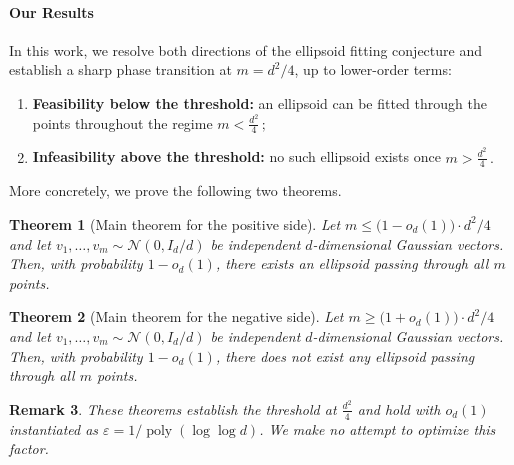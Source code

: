 \documentclass[12pt]{article}
\newtheorem{theorem}{Theorem}[section]
\newtheorem{remark}[theorem]{Remark}
\newcommand{\poly}{\operatorname{poly}}
\newcommand{\Authornote}[3]{{\sf\footnotesize\color{#3}{[#1: #2]}}}
\newcommand{\Authornote}[3]{}
\newcommand{\snote}[1]{\Authornote{Sofia}{#1}{orange}}
\begin{document}
\paragraph{Our Results}
%
In this work, we resolve both directions of the ellipsoid fitting conjecture and establish a sharp phase transition at \(m=d^2/4\), up to lower-order terms:
\begin{enumerate}
    \item \textbf{Feasibility below the threshold:} an ellipsoid can be fitted through the points throughout the regime
    \(
        m < \frac{d^2}{4}\,;
    \)
    
    \item \textbf{Infeasibility above the threshold:} no such ellipsoid exists once
   \(
        m > \frac{d^2}{4}\,.
    \)
  
\end{enumerate}

More concretely, we prove the following two theorems.

\begin{theorem}[Main theorem for the positive side]
\label{thm:ellipsoid-thm}
Let
\(
    m \leq \bigl(1-o_d(1)\bigr) \cdot d^2/4\)
and let \(v_1,\dots,v_m\sim \mathcal N(0,I_d/d)\) be independent \(d\)-dimensional Gaussian vectors. Then, with probability \(1-o_d(1)\), there exists an ellipsoid passing through all \(m\) points.
\end{theorem}
%
\begin{theorem}[Main theorem for the negative side]
\label{thm:ellipsoid-refutation-thm}
Let
\(
    m \geq \bigl(1+o_d(1)\bigr) \cdot d^2/4
\)
and let \(v_1,\dots,v_m\sim \mathcal N(0,I_d/d)\) be independent \(d\)-dimensional Gaussian vectors. Then, with probability \(1-o_d(1)\), there does not exist any ellipsoid passing through all \(m\) points.
\end{theorem}

\begin{remark}
    These theorems establish the threshold at $\frac{d^2}{4}$ and hold with $o_d(1)$ instantiated as $\varepsilon = 1/\poly(\log \log d)$. We make no attempt to optimize this factor.
\end{remark}
\end{document}
